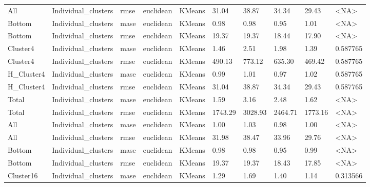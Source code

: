\begin{tabular}{llllllllll}
        All & Individual\_clusters &   rmse &  euclidean &        KMeans &   31.04 &    38.87 &                 34.34 &         29.43 &      <NA> \\
     Bottom & Individual\_clusters &   mase &  euclidean &        KMeans &    0.98 &     0.98 &                  0.95 &          1.01 &      <NA> \\
     Bottom & Individual\_clusters &   rmse &  euclidean &        KMeans &   19.37 &    19.37 &                 18.44 &         17.90 &      <NA> \\
   Cluster4 & Individual\_clusters &   mase &  euclidean &        KMeans &    1.46 &     2.51 &                  1.98 &          1.39 &  0.587765 \\
   Cluster4 & Individual\_clusters &   rmse &  euclidean &        KMeans &  490.13 &   773.12 &                635.30 &        469.42 &  0.587765 \\
 H\_Cluster4 & Individual\_clusters &   mase &  euclidean &        KMeans &    0.99 &     1.01 &                  0.97 &          1.02 &  0.587765 \\
 H\_Cluster4 & Individual\_clusters &   rmse &  euclidean &        KMeans &   31.04 &    38.87 &                 34.34 &         29.43 &  0.587765 \\
      Total & Individual\_clusters &   mase &  euclidean &        KMeans &    1.59 &     3.16 &                  2.48 &          1.62 &      <NA> \\
      Total & Individual\_clusters &   rmse &  euclidean &        KMeans & 1743.29 &  3028.93 &               2464.71 &       1773.16 &      <NA> \\
        All & Individual\_clusters &   mase &  euclidean &        KMeans &    1.00 &     1.03 &                  0.98 &          1.00 &      <NA> \\
        All & Individual\_clusters &   rmse &  euclidean &        KMeans &   31.98 &    38.47 &                 33.96 &         29.76 &      <NA> \\
     Bottom & Individual\_clusters &   mase &  euclidean &        KMeans &    0.98 &     0.98 &                  0.95 &          0.99 &      <NA> \\
     Bottom & Individual\_clusters &   rmse &  euclidean &        KMeans &   19.37 &    19.37 &                 18.43 &         17.85 &      <NA> \\
  Cluster16 & Individual\_clusters &   mase &  euclidean &        KMeans &    1.29 &     1.69 &                  1.40 &          1.14 &  0.313566 \\

\end{tabular}
